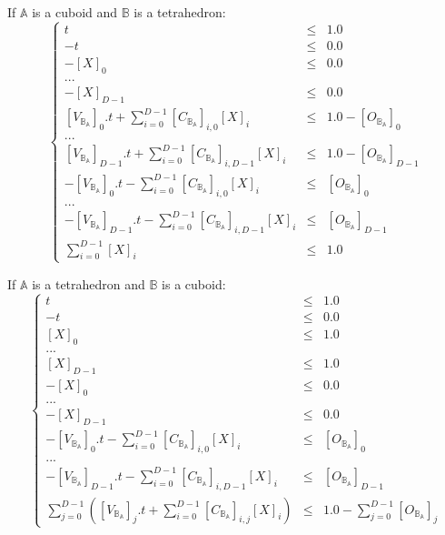 \documentclass[12pt, a4paper]{article}
\begin{document}
If $\mathbb{A}$ is a cuboid and $\mathbb{B}$ is a tetrahedron:
\begin{equation}
\left\lbrace
\begin{array}{rcl}
t&\le&1.0\\
-t&\le&0.0\\
-\left[X\right]_0&\le&0.0\\
...\\
-\left[X\right]_{D-1}&\le&0.0\\
\left[V_{\mathbb{B}_\mathbb{A}}\right]_0.t+\sum_{i=0}^{D-1}\left[C_{\mathbb{B}_\mathbb{A}}\right]_{i,0}\left[X\right]_i&\le&1.0-\left[O_{\mathbb{B}_\mathbb{A}}\right]_0\\
...\\
\left[V_{\mathbb{B}_\mathbb{A}}\right]_{D-1}.t+\sum_{i=0}^{D-1}\left[C_{\mathbb{B}_\mathbb{A}}\right]_{i,D-1}\left[X\right]_i&\le&1.0-\left[O_{\mathbb{B}_\mathbb{A}}\right]_{D-1}\\
-\left[V_{\mathbb{B}_\mathbb{A}}\right]_0.t-\sum_{i=0}^{D-1}\left[C_{\mathbb{B}_\mathbb{A}}\right]_{i,0}\left[X\right]_i&\le&\left[O_{\mathbb{B}_\mathbb{A}}\right]_0\\
...\\
-\left[V_{\mathbb{B}_\mathbb{A}}\right]_{D-1}.t-\sum_{i=0}^{D-1}\left[C_{\mathbb{B}_\mathbb{A}}\right]_{i,D-1}\left[X\right]_i&\le&\left[O_{\mathbb{B}_\mathbb{A}}\right]_{D-1}\\
\sum_{i=0}^{D-1}\left[X\right]_i&\le&1.0
\end{array}
\right.
\end{equation}

If $\mathbb{A}$ is a tetrahedron and $\mathbb{B}$ is a cuboid:
\begin{equation}
\left\lbrace
\begin{array}{rcl}
t&\le&1.0\\
-t&\le&0.0\\
\left[X\right]_0&\le&1.0\\
...\\
\left[X\right]_{D-1}&\le&1.0\\
-\left[X\right]_0&\le&0.0\\
...\\
-\left[X\right]_{D-1}&\le&0.0\\
-\left[V_{\mathbb{B}_\mathbb{A}}\right]_0.t-\sum_{i=0}^{D-1}\left[C_{\mathbb{B}_\mathbb{A}}\right]_{i,0}\left[X\right]_i&\le&\left[O_{\mathbb{B}_\mathbb{A}}\right]_0\\
...\\
-\left[V_{\mathbb{B}_\mathbb{A}}\right]_{D-1}.t-\sum_{i=0}^{D-1}\left[C_{\mathbb{B}_\mathbb{A}}\right]_{i,D-1}\left[X\right]_i&\le&\left[O_{\mathbb{B}_\mathbb{A}}\right]_{D-1}\\
\sum_{j=0}^{D-1}\left(\left[V_{\mathbb{B}_\mathbb{A}}\right]_j.t+\sum_{i=0}^{D-1}\left[C_{\mathbb{B}_\mathbb{A}}\right]_{i,j}\left[X\right]_i\right)&\le&1.0-\sum_{j=0}^{D-1}\left[O_{\mathbb{B}_\mathbb{A}}\right]_{j}
\end{array}
\right.
\end{equation}
\end{document}
